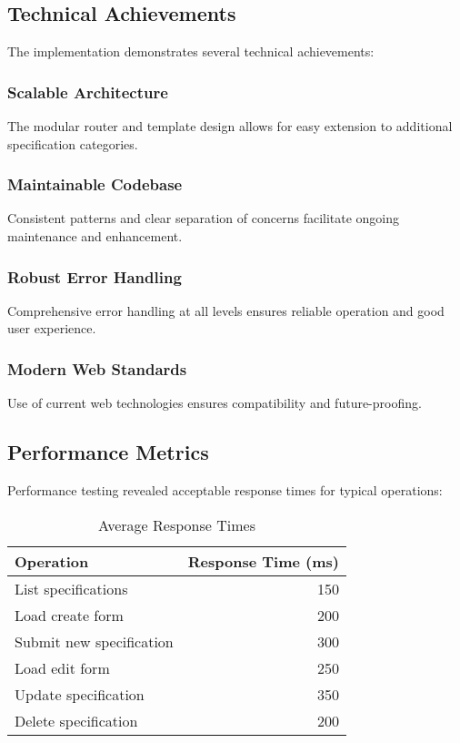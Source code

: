 \documentclass[11pt,a4paper]{article}
\begin{document}
\subsection{Technical Achievements}

The implementation demonstrates several technical achievements:

\subsubsection{Scalable Architecture}
The modular router and template design allows for easy extension to additional specification categories.

\subsubsection{Maintainable Codebase}
Consistent patterns and clear separation of concerns facilitate ongoing maintenance and enhancement.

\subsubsection{Robust Error Handling}
Comprehensive error handling at all levels ensures reliable operation and good user experience.

\subsubsection{Modern Web Standards}
Use of current web technologies ensures compatibility and future-proofing.

\subsection{Performance Metrics}

Performance testing revealed acceptable response times for typical operations:

\begin{table}[H]
\centering
\caption{Average Response Times}
\begin{tabular}{@{}lr@{}}
\toprule
\textbf{Operation} & \textbf{Response Time (ms)} \\
\midrule
List specifications & 150 \\
Load create form & 200 \\
Submit new specification & 300 \\
Load edit form & 250 \\
Update specification & 350 \\
Delete specification & 200 \\
\bottomrule
\end{tabular}
\end{table}
\end{document}
